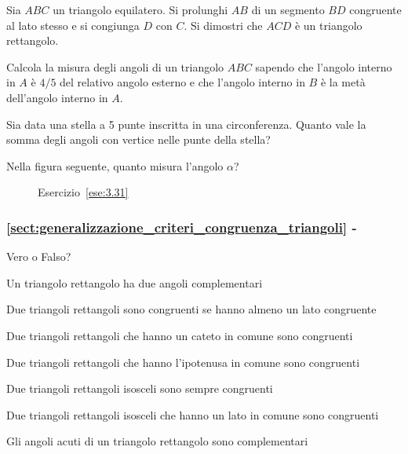 \begin{esercizio}
\label{ese:3.48}
Sia $ABC$ un triangolo equilatero. Si prolunghi $AB$ di un segmento $BD$ congruente al lato stesso e si congiunga $D$ con $C$. Si dimostri che $ACD$ è un triangolo rettangolo.
\end{esercizio}

\begin{esercizio}
\label{ese:3.49}
Calcola la misura degli angoli di un triangolo $ABC$ sapendo che l'angolo interno in $A$ è $4/5$ del relativo angolo esterno e che l'angolo interno in $B$ è la metà dell'angolo interno in $A$.
\end{esercizio}

\begin{esercizio}
\label{ese:3.50}
Sia data una stella a 5 punte inscritta in una circonferenza. Quanto vale la somma degli angoli con vertice nelle punte della stella? 
\end{esercizio}

\begin{esercizio}
\label{ese:3.51}
Nella figura seguente, quanto misura l'angolo $\alpha$?  
\end{esercizio}
\begin{figure}[htb]
\centering
\caption{Esercizio~\ref{ese:3.31}}\label{fig:ese3.51}
\end{figure}

\begingroup
\hypersetup{linkcolor=black}
\subsubsection*{\ref{sect:generalizzazione_criteri_congruenza_triangoli} - }
\endgroup

\begin{esercizio}
\label{ese:3.52}
Vero o Falso?
\begin{enumeratea}
\item Un triangolo rettangolo ha due angoli complementari\hfill\boxV\quad\boxF
\item Due triangoli rettangoli sono congruenti se hanno almeno un lato congruente\hfill\boxV\quad\boxF
\item Due triangoli rettangoli che hanno un cateto in comune sono congruenti\hfill\boxV\quad\boxF
\item Due triangoli rettangoli che hanno l'ipotenusa in comune sono congruenti\hfill\boxV\quad\boxF
\item Due triangoli rettangoli isosceli sono sempre congruenti\hfill\boxV\quad\boxF
\item Due triangoli rettangoli isosceli che hanno un lato in comune sono congruenti\hfill\boxV\quad\boxF
\item Gli angoli acuti di un triangolo rettangolo sono complementari\hfill\boxV\quad\boxF
\end{enumeratea}
\end{esercizio}

